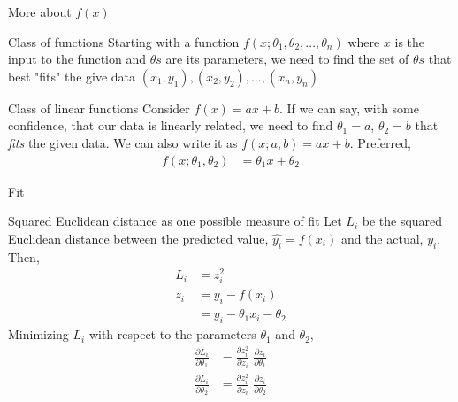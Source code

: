 \begin{frame}{More about $f(x)$}
	\begin{block}{Class of functions} 
		Starting with a function $f(x;\theta_1,\theta_2,\dots, \theta_n)$
		where $x$ is the input to the function and $\theta s$ are its parameters, 
		we need to find the set of $\theta s$ that best "fits" the give 
		data $(x_1,y_1),(x_2,y_2), \dots, (x_n,y_n)$ 
		
	\end{block}
	\begin{block}{Class of linear functions}
		Consider  $f(x) = ax+b$. If we can say, with some confidence, that 
		our data is linearly related,  we need to find  
		$\theta_1=a$, $\theta_2=b$ that {\it fits} the given data. 
		We can also write it as $f(x;a,b) = ax+b$. 
	\newline 
	Preferred,  
	\begin{align}
	f(x;\theta_1,\theta_2) &= \theta_1x+\theta_2	
	\end{align}

	\end{block}

\end{frame}
\begin{frame}{Fit}
	\begin{block}{Squared Euclidean distance as one possible measure of fit}
		Let $L_i$ be the squared Euclidean distance between the predicted 
		value, $\hat{y_i}=f(x_i)$ and the actual, $y_i$. Then,  
		\begin{align}
		L_i &=z_i^2 \\
		z_i &=y_i-f(x_i)\\
		    &=y_i-\theta_1 x_i-\theta_2 
		\end{align}
		Minimizing $L_i$ with respect to the parameters $\theta_1$ and $\theta_2$,
		\begin{align}
		\frac{\partial L_i}{\partial \theta_1} &= 
		\frac{\partial z_i^2}{\partial z_i} \; 
		\frac{\partial z_i}{\partial \theta_1}  \\
		\frac{\partial L_i}{\partial \theta_2} &= 
		\frac{\partial z_i^2}{\partial z_i} \; 
		\frac{\partial z_i}{\partial \theta_2}  \\
		\end{align}
	\end{block}
\end{frame}


